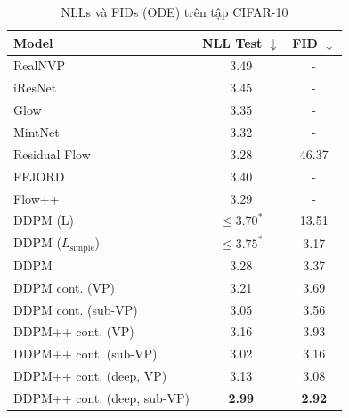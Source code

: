 \documentclass{article} %
\begin{document}
\begin{table}[h!]
    \centering
    \caption{NLLs và FIDs (ODE) trên tập CIFAR-10}
    \begin{tabular}{lcc}
        \hline
        Model & NLL Test $\downarrow$ & FID $\downarrow$ \\
        \hline
        RealNVP \citep{dinh2016density} & 3.49 & - \\
        iResNet \citep{behrmann2019invertible} & 3.45 & - \\
        Glow \citep{kingma2018glow} & 3.35 & - \\
        MintNet \citep{song2019mintnet} & 3.32 & - \\
        Residual Flow \citep{chen2019residual} & 3.28 & 46.37 \\
        FFJORD \citep{grathwohl2018ffjord} & 3.40 & - \\
        Flow++ \citep{ho2019flow++} & 3.29 & - \\
        DDPM (L) \citep{ho2020denoising} & $\leq 3.70^{\ast}$  & 13.51 \\
        DDPM ($L_{\mathrm{simple}}$) \citep{ho2020denoising} & $\leq 3.75^{\ast}$ & 3.17 \\
        \hline
        DDPM & 3.28 & 3.37 \\
        DDPM cont. (VP) & 3.21 & 3.69 \\
        DDPM cont. (sub-VP) & 3.05 & 3.56 \\
        DDPM++ cont. (VP) & 3.16 & 3.93 \\
        DDPM++ cont. (sub-VP) & 3.02 & 3.16 \\
        DDPM++ cont. (deep, VP) & 3.13 & 3.08 \\
        DDPM++ cont. (deep, sub-VP) & \textbf{2.99} & \textbf{2.92} \\
        \hline
    \end{tabular}
    \label{tab:2}
\end{table}
\end{document}
